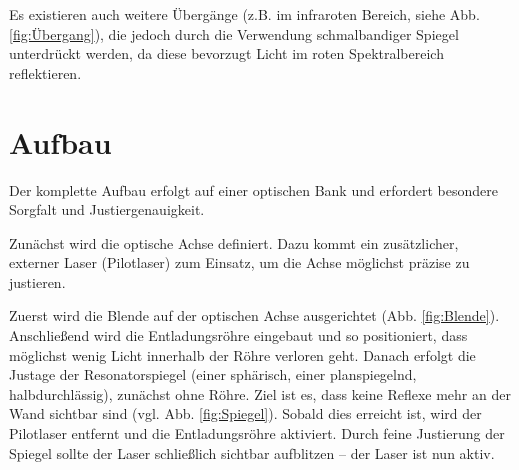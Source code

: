 Es existieren auch weitere Übergänge (z.B. im infraroten Bereich, siehe Abb.\ref{fig:Übergang}), die jedoch durch die Verwendung schmalbandiger Spiegel unterdrückt werden, da diese bevorzugt Licht im roten Spektralbereich reflektieren.

\FloatBarrier
\FloatBarrier




\section{Aufbau}


Der komplette Aufbau erfolgt auf einer optischen Bank und erfordert besondere Sorgfalt und Justiergenauigkeit.

Zunächst wird die optische Achse definiert. 
Dazu kommt ein zusätzlicher, externer Laser (Pilotlaser) zum Einsatz, um die Achse möglichst präzise zu justieren.


Zuerst wird die Blende auf der optischen Achse ausgerichtet (Abb. \ref{fig:Blende}). 
Anschließend wird die Entladungsröhre eingebaut und so positioniert, dass möglichst wenig Licht innerhalb der Röhre verloren geht.
Danach erfolgt die Justage der Resonatorspiegel (einer sphärisch, einer planspiegelnd, halbdurchlässig), zunächst ohne Röhre. 
Ziel ist es, dass keine Reflexe mehr an der Wand sichtbar sind (vgl. Abb. \ref{fig:Spiegel}). 
Sobald dies erreicht ist, wird der Pilotlaser entfernt und die Entladungsröhre aktiviert. 
Durch feine Justierung der Spiegel sollte der Laser schließlich sichtbar aufblitzen – der Laser ist nun aktiv.



